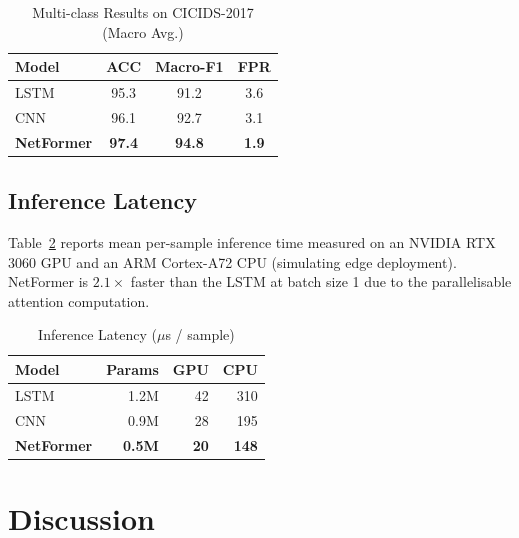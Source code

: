 \documentclass[conference]{IEEEtran}
\begin{document}
\begin{table}[h]
	\caption{Multi-class Results on CICIDS-2017 (Macro Avg.)}
	\label{tab:cicids}
	\centering
	\begin{tabular}{@{} l c c c @{}}
		\toprule
		\textbf{Model}     & \textbf{ACC}  & \textbf{Macro-F1} & \textbf{FPR} \\
		\midrule
		LSTM               & 95.3          & 91.2              & 3.6          \\
		CNN                & 96.1          & 92.7              & 3.1          \\
		\textbf{NetFormer} & \textbf{97.4} & \textbf{94.8}     & \textbf{1.9} \\
		\bottomrule
	\end{tabular}
\end{table}

\subsection{Inference Latency}

Table~\ref{tab:latency} reports mean per-sample inference time
measured on an NVIDIA RTX 3060 GPU and an ARM Cortex-A72 CPU
(simulating edge deployment). NetFormer is $2.1\times$ faster than
the LSTM at batch size 1 due to the parallelisable attention
computation.

\begin{table}[h]
	\caption{Inference Latency ($\mu$s / sample)}
	\label{tab:latency}
	\centering
	\begin{tabular}{@{} l r r r @{}}
		\toprule
		\textbf{Model}     & \textbf{Params} & \textbf{GPU} & \textbf{CPU} \\
		\midrule
		LSTM               & 1.2M            & 42           & 310          \\
		CNN                & 0.9M            & 28           & 195          \\
		\textbf{NetFormer} & \textbf{0.5M}   & \textbf{20}  & \textbf{148} \\
		\bottomrule
	\end{tabular}
\end{table}

\section{Discussion}
\label{sec:discussion}
\end{document}
